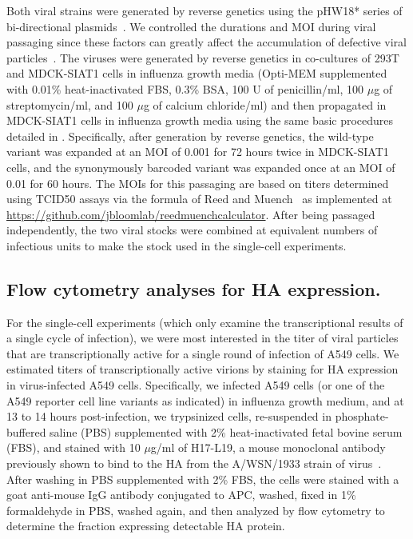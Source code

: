 \documentclass[lineno]{asm-article}
\begin{document}
Both viral strains were generated by reverse genetics using the pHW18* series of bi-directional plasmids~\cite{hoffmann2000dna}.
We controlled the durations and MOI during viral passaging since these factors can greatly affect the accumulation of defective viral particles~\cite{xue2016propagation}.
The viruses were generated by reverse genetics in co-cultures of 293T and MDCK-SIAT1 cells in influenza growth media (Opti-MEM supplemented with 0.01\% heat-inactivated FBS, 0.3\% BSA, 100 U of penicillin/ml, 100 $\mu$g of streptomycin/ml, and 100 $\mu$g of calcium chloride/ml) and then propagated in MDCK-SIAT1 cells in influenza growth media using the same basic procedures detailed in \cite{russell2018extreme}.
Specifically, after generation by reverse genetics, the wild-type variant was expanded at an MOI of 0.001 for 72 hours twice in MDCK-SIAT1 cells, and the synonymously barcoded variant was expanded once at an MOI of 0.01 for 60 hours.
The MOIs for this passaging are based on titers determined using TCID50 assays via the formula of Reed and Muench~\cite{reed1938simple} as implemented at \url{https://github.com/jbloomlab/reedmuenchcalculator}.
After being passaged independently, the two viral stocks were combined at equivalent numbers of infectious units to make the stock used in the single-cell experiments.

\subsection{Flow cytometry analyses for HA expression.}
For the single-cell experiments (which only examine the transcriptional results of a single cycle of infection), we were most interested in the titer of viral particles that are transcriptionally active for a single round of infection of A549 cells.
We estimated titers of transcriptionally active virions by staining for HA expression in virus-infected A549 cells.
Specifically, we infected A549 cells (or one of the A549 reporter cell line variants as indicated) in influenza growth medium, and at 13 to 14 hours post-infection, we trypsinized cells, re-suspended in phosphate-buffered saline (PBS) supplemented with 2\% heat-inactivated fetal bovine serum (FBS), and stained with 10 $\mu$g/ml of H17-L19, a mouse monoclonal antibody previously shown to bind to the HA from the A/WSN/1933 strain of virus~\cite{doud2017complete}.
After washing in PBS supplemented with 2\% FBS, the cells were stained with a goat anti-mouse IgG antibody conjugated to APC, washed, fixed in 1\% formaldehyde in PBS, washed again, and then analyzed by flow cytometry to determine the fraction expressing detectable HA protein.
\end{document}
